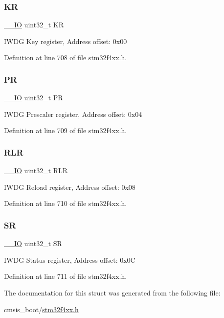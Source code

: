 \subsubsection{\texorpdfstring{KR}{KR}}
{\footnotesize\ttfamily \hyperlink{group___c_m_s_i_s__core__definitions_gaec43007d9998a0a0e01faede4133d6be}{\+\_\+\+\_\+\+IO} uint32\+\_\+t KR}

I\+W\+DG Key register, Address offset\+: 0x00 

Definition at line 708 of file stm32f4xx.\+h.

\mbox{\label{struct_i_w_d_g___type_def_af8d25514079514d38c104402f46470af}} 
\subsubsection{\texorpdfstring{PR}{PR}}
{\footnotesize\ttfamily \hyperlink{group___c_m_s_i_s__core__definitions_gaec43007d9998a0a0e01faede4133d6be}{\+\_\+\+\_\+\+IO} uint32\+\_\+t PR}

I\+W\+DG Prescaler register, Address offset\+: 0x04 

Definition at line 709 of file stm32f4xx.\+h.

\mbox{\label{struct_i_w_d_g___type_def_a7015e1046dbd3ea8783b33dc11a69e52}} 
\subsubsection{\texorpdfstring{R\+LR}{RLR}}
{\footnotesize\ttfamily \hyperlink{group___c_m_s_i_s__core__definitions_gaec43007d9998a0a0e01faede4133d6be}{\+\_\+\+\_\+\+IO} uint32\+\_\+t R\+LR}

I\+W\+DG Reload register, Address offset\+: 0x08 

Definition at line 710 of file stm32f4xx.\+h.

\mbox{\label{struct_i_w_d_g___type_def_af6aca2bbd40c0fb6df7c3aebe224a360}} 
\subsubsection{\texorpdfstring{SR}{SR}}
{\footnotesize\ttfamily \hyperlink{group___c_m_s_i_s__core__definitions_gaec43007d9998a0a0e01faede4133d6be}{\+\_\+\+\_\+\+IO} uint32\+\_\+t SR}

I\+W\+DG Status register, Address offset\+: 0x0C 

Definition at line 711 of file stm32f4xx.\+h.



The documentation for this struct was generated from the following file\+:\begin{DoxyCompactItemize}
\item 
cmsis\+\_\+boot/\hyperlink{stm32f4xx_8h}{stm32f4xx.\+h}\end{DoxyCompactItemize}
